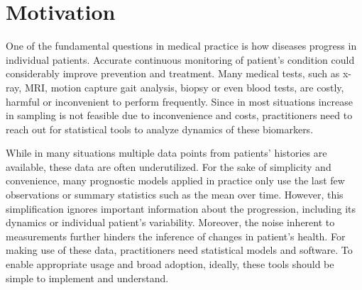 \documentclass[preprint]{imsart}
\numberwithin{equation}{section}
\theoremstyle{plain}
\begin{document}
\begin{frontmatter}
\begin{abstract}
  
\end{abstract}

\begin{keyword}[class=MSC]
\end{keyword}

\begin{keyword}
\end{keyword}

\end{frontmatter}

\maketitle

\tableofcontents

\section{Motivation}

One of the fundamental questions in medical practice is how diseases progress in individual patients. Accurate continuous monitoring of patient's condition could considerably improve prevention and treatment. Many medical tests, such as x-ray, MRI, motion capture gait analysis, biopsy or even blood tests, are costly, harmful or inconvenient to perform frequently. Since in most situations increase in sampling is not feasible due to inconvenience and costs, practitioners need to reach out for statistical tools to analyze dynamics of these biomarkers.

While in many situations multiple data points from patients' histories are available, these data are often underutilized. For the sake of simplicity and convenience, many prognostic models applied in practice only use the last few observations or summary statistics such as the mean over time. However, this simplification ignores important information about the progression, including its dynamics or individual patient's variability. Moreover, the noise inherent to measurements further hinders the inference of changes in patient's health. For making use of these data, practitioners need statistical models and software. To enable appropriate usage and broad adoption, ideally, these tools should be simple to implement and understand.
\end{document}
